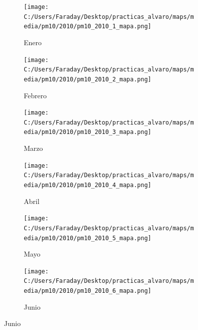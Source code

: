 \documentclass[12pt]{article}
\begin{document}
\begin{figure}[H]
\centering
\begin{subfigure}[H]{0.15\textwidth}
\texttt{[image: C:/Users/Faraday/Desktop/practicas\_alvaro/maps/media/pm10/2010/pm10\_2010\_1\_mapa.png]}
\captionsetup{labelformat=empty}
\caption{Enero}
\label{fig:map-pm10-2010-1}
\end{subfigure}
%
\begin{subfigure}[H]{0.15\textwidth}
\texttt{[image: C:/Users/Faraday/Desktop/practicas\_alvaro/maps/media/pm10/2010/pm10\_2010\_2\_mapa.png]}
\captionsetup{labelformat=empty}
\caption{Febrero}
\label{fig:map-pm10-2010-2}
\end{subfigure}
%
\begin{subfigure}[H]{0.15\textwidth}
\texttt{[image: C:/Users/Faraday/Desktop/practicas\_alvaro/maps/media/pm10/2010/pm10\_2010\_3\_mapa.png]}
\captionsetup{labelformat=empty}
\caption{Marzo}
\label{fig:map-pm10-2010-3}
\end{subfigure}
%
\begin{subfigure}[H]{0.15\textwidth}
\texttt{[image: C:/Users/Faraday/Desktop/practicas\_alvaro/maps/media/pm10/2010/pm10\_2010\_4\_mapa.png]}
\captionsetup{labelformat=empty}
\caption{Abril}
\label{fig:map-pm10-2010-4}
\end{subfigure}
%
\begin{subfigure}[H]{0.15\textwidth}
\texttt{[image: C:/Users/Faraday/Desktop/practicas\_alvaro/maps/media/pm10/2010/pm10\_2010\_5\_mapa.png]}
\captionsetup{labelformat=empty}
\caption{Mayo}
\label{fig:map-pm10-2010-5}
\end{subfigure}
%
\begin{subfigure}[H]{0.15\textwidth}
\texttt{[image: C:/Users/Faraday/Desktop/practicas\_alvaro/maps/media/pm10/2010/pm10\_2010\_6\_mapa.png]}
\captionsetup{labelformat=empty}
\caption{Junio}
\label{fig:map-pm10-2010-6}
\end{subfigure}


\end{figure}
\end{document}
